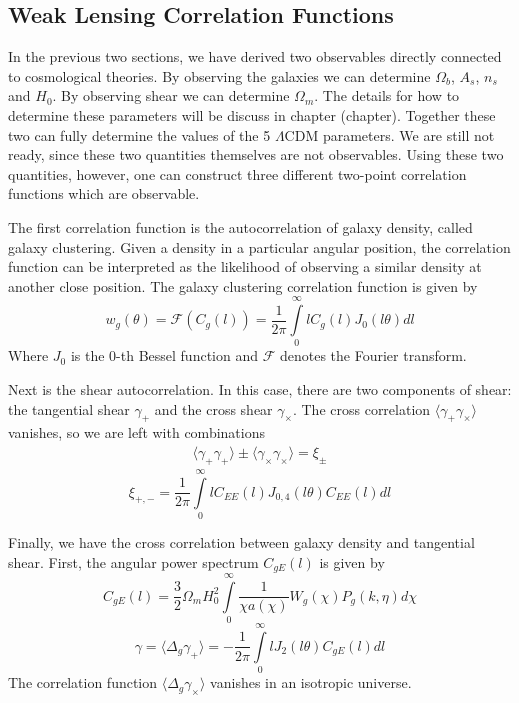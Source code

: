 \subsection{Weak Lensing Correlation Functions}
In the previous two sections, we have derived two observables directly connected to cosmological theories. By observing the galaxies we can determine $\Omega_b$, $A_s$, $n_s$ and $H_0$. By observing shear we can determine $\Omega_m$. The details for how to determine these parameters will be discuss in chapter (chapter). Together these two can fully determine the values of the 5 $\Lambda$CDM parameters. We are still not ready, since these two quantities themselves are not observables. Using these two quantities, however, one can construct three different two-point correlation functions which are observable.

The first correlation function is the autocorrelation of galaxy density, called galaxy clustering. Given a density in a particular angular position, the correlation function can be interpreted as the likelihood of observing a similar density at another close position. The galaxy clustering correlation function is given by
\begin{equation}
	w_g(\theta) = \mathcal{F}(C_g(l)) = \frac{1}{2\pi}\int\limits_0^\infty l C_g(l) J_0(l\theta)dl
\end{equation}
Where $J_0$ is the 0-th Bessel function and $\mathcal{F}$ denotes the Fourier transform.

Next is the shear autocorrelation. In this case, there are two components of shear: the tangential shear $\gamma_+$ and the cross shear $\gamma_\times$. The cross correlation $\langle \gamma_+ \gamma_\times \rangle$ vanishes, so we are left with combinations
\begin{equation}
	\begin{split}
		\langle \gamma_+\gamma_+ \rangle \pm \langle \gamma_\times \gamma_\times \rangle = \xi_\pm
	\end{split}
\end{equation}
\begin{equation}
	\xi_{+,-} = \frac{1}{2\pi}\int\limits_0^\infty l C_{EE}(l) J_{0,4}(l\theta)C_{EE}(l)dl
\end{equation}

Finally, we have the cross correlation between galaxy density and tangential shear. First, the angular power spectrum $C_{gE}(l)$ is given by
\begin{equation}
	C_{gE}(l) = \frac{3}{2}\Omega_mH_0^2 \int\limits_0^\infty \frac{1}{\chi a(\chi)}W_g(\chi)P_g(k,\eta) d\chi
\end{equation}
\begin{equation}
	\gamma = \langle \Delta_g\gamma_+\rangle = -\frac{1}{2\pi}\int\limits_0^\infty l J_2(l\theta)C_{gE}(l)dl
\end{equation}
The correlation function $\langle \Delta_g\gamma_\times\rangle$ vanishes in an isotropic universe.

